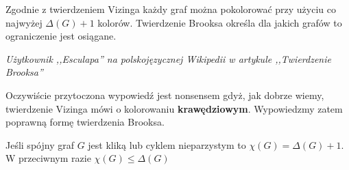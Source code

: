    \epigraph{
   Zgodnie z twierdzeniem Vizinga każdy graf można pokolorować przy użyciu co najwyżej $\Delta(G)+1$ kolorów. Twierdzenie Brooksa określa dla jakich grafów to ograniczenie jest osiągane.
   }{\textit{
    Użytkownik ,,Esculapa'' na polskojęzycznej Wikipedii w artykule ,,Twierdzenie Brooksa''}}
    
    Oczywiście przytoczona wypowiedź jest nonsensem gdyż, jak dobrze wiemy, twierdzenie Vizinga mówi o kolorowaniu \textbf{krawędziowym}.
    Wypowiedzmy zatem poprawną formę twierdzenia Brooksa.
    
    \begin{theorem}[Brooks]
        Jeśli spójny graf $G$ jest kliką lub cyklem nieparzystym to $\chi(G) = \Delta(G) + 1$.
        W przeciwnym razie $\chi(G) \leq \Delta(G)$
    \end{theorem}
   
